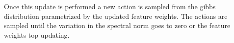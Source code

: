 Once this update is performed a new action is sampled from the gibbs distribution parametrized by the updated feature weights. The actions are sampled until the variation in the spectral norm goes to zero or the feature weights top updating.
